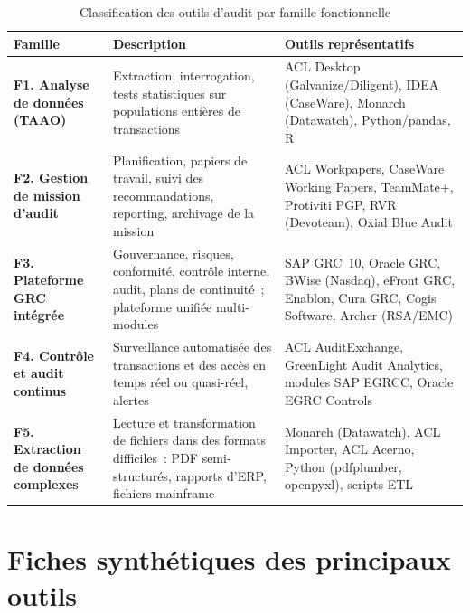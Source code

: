 \begin{table}[H]
\centering
\small
\renewcommand{\arraystretch}{1.5}
\caption{Classification des outils d'audit par famille fonctionnelle}
\label{tab:classification-outils}
\begin{tabular}{|p{3cm}|p{5cm}|p{5.5cm}|}
  \hline
  \rowcolor{gray!20}
  \textbf{Famille} & \textbf{Description} & \textbf{Outils représentatifs} \\ \hline

  \textbf{F1. Analyse de données (TAAO)} &
  Extraction, interrogation, tests statistiques sur populations entières de
  transactions &
  ACL Desktop (Galvanize/Diligent), IDEA (CaseWare), Monarch (Datawatch),
  Python/pandas, R \\ \hline

  \textbf{F2. Gestion de mission d'audit} &
  Planification, papiers de travail, suivi des recommandations,
  reporting, archivage de la mission &
  ACL Workpapers, CaseWare Working Papers, TeamMate+, Protiviti PGP,
  RVR (Devoteam), Oxial Blue Audit \\ \hline

  \textbf{F3. Plateforme GRC intégrée} &
  Gouvernance, risques, conformité, contrôle interne, audit, plans de
  continuité~; plateforme unifiée multi-modules &
  SAP GRC~10, Oracle GRC, BWise (Nasdaq), eFront GRC, Enablon, Cura GRC,
  Cogis Software, Archer (RSA/EMC) \\ \hline

  \textbf{F4. Contrôle et audit continus} &
  Surveillance automatisée des transactions et des accès en temps réel
  ou quasi-réel, alertes &
  ACL AuditExchange, GreenLight Audit Analytics, modules SAP EGRCC,
  Oracle EGRC Controls \\ \hline

  \textbf{F5. Extraction de données complexes} &
  Lecture et transformation de fichiers dans des formats difficiles~:
  PDF semi-structurés, rapports d'ERP, fichiers mainframe &
  Monarch (Datawatch), ACL Importer, ACL Acerno, Python (pdfplumber,
  openpyxl), scripts ETL \\ \hline
\end{tabular}
\end{table}

\section{Fiches synthétiques des principaux outils}
\label{sec:fiches-outils}

